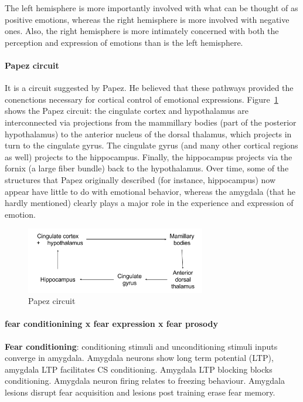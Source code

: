 \documentclass[12pt,article,oneside,a4paper]{memoir}
\begin{document}
The left hemisphere is more importantly involved with what can be thought of as
positive emotions, whereas the right hemisphere is more involved with negative
ones. Also, the right hemisphere is more intimately concerned with both the 
perception and expression of emotions than is the left hemisphere.

\paragraph{Papez circuit}
It is a circuit suggested by Papez. He believed that these pathways provided
the conenctions necessary for cortical control of emotional expressions.
Figure~\ref{fig:papez-circuit} shows the Papez circuit: the cingulate cortex
and hypothalamus are interconnected via projections from the mammillary bodies
(part of the posterior hypothalamus) to the anterior nucleus of the dorsal
thalamus, which projects in turn to the cingulate gyrus.
The cingulate gyrus (and many other cortical regions as well) projects to the
hippocampus. Finally, the hippocampus projects via the fornix (a large fiber
bundle) back to the hypothalamus. Over time, some of the structures that Papez
originally described (for instance, hippocampus) now appear have little to do 
with emotional behavior, whereas the amygdala (that he hardly mentioned)
clearly plays a major role in the experience and expression of emotion.

\begin{figure}
  \centering
  \includegraphics[width=0.7\textwidth]{imgs/papez-circuit.png}
  \caption{Papez circuit}
  \label{fig:papez-circuit}
\end{figure}

\paragraph{fear conditionining x fear expression x fear prosody}
\textbf{Fear conditioning}: conditioning stimuli and unconditioning stimuli
inputs converge in amygdala. Amygdala neurons show long term potential (LTP),
amygdala LTP facilitates CS conditioning. Amygdala LTP blocking blocks
conditioning. Amygdala neuron firing relates to freezing behaviour. Amygdala
lesions disrupt fear acquisition and lesions post training erase fear memory.
\end{document}
